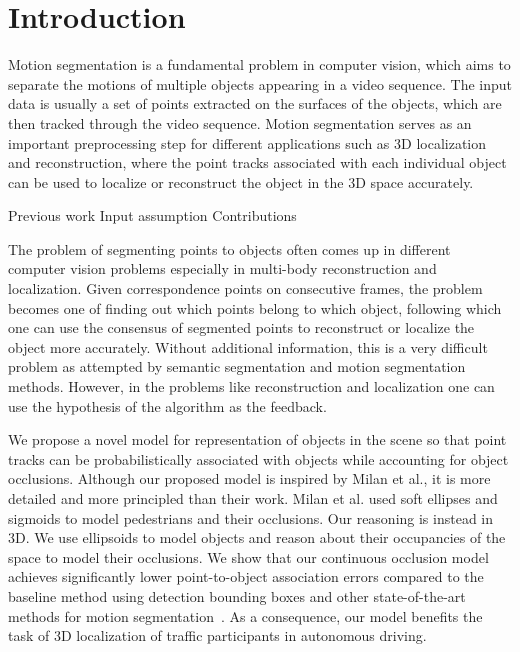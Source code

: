 \section{Introduction}
Motion segmentation is a fundamental problem in computer vision, which aims to separate the motions of multiple objects appearing in a video sequence. The input data is usually a set of points extracted on the surfaces of the objects, which are then tracked through the video sequence. Motion segmentation serves as an important preprocessing step for different applications such as 3D localization and reconstruction, where the point tracks associated with each individual object can be used to localize or reconstruct the object in the 3D space accurately.

Previous work 
Input assumption
Contributions


The problem of segmenting points to objects often comes up in different
computer vision problems especially in multi-body 
reconstruction and localization. Given correspondence points on
consecutive frames, the problem becomes one of finding out which points belong
to which object, following which one can use the consensus of segmented points
to reconstruct or localize the object more accurately. Without additional 
information, this is a very difficult problem as attempted by semantic segmentation 
and motion segmentation methods. However, in the problems like reconstruction and
localization one can use the hypothesis of the algorithm as the feedback.

We propose a novel model for representation of objects in the scene so that point tracks
can be probabilistically associated with objects while accounting for object occlusions.
Although our proposed model is inspired by Milan et
al.\cite{Milan_etal_2014}, it is more detailed and more principled than their
work. Milan et al. used soft ellipses and sigmoids to model pedestrians and
their occlusions. Our reasoning is instead in 3D. We use ellipsoids to model objects
and reason about their occupancies of the space to model their occlusions.
We show that our continuous occlusion model achieves significantly lower point-to-object association errors compared to the baseline method using detection bounding boxes and other state-of-the-art methods for motion segmentation~\cite{Brox_Malik_2010, Rao_etal_2010}. As a consequence, our model benefits the task of 3D localization of traffic participants in autonomous driving.
